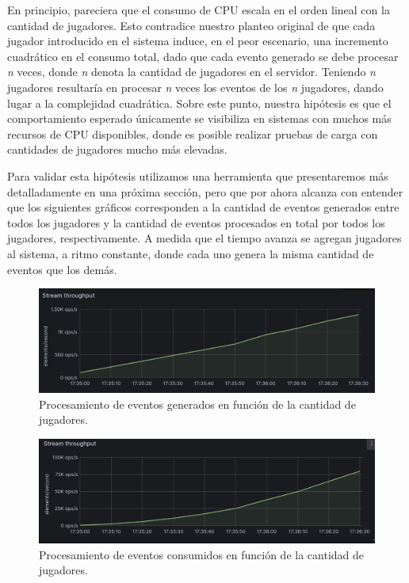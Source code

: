 En principio, pareciera que el consumo de CPU escala en el orden lineal con la cantidad de jugadores. Esto contradice nuestro planteo original
de que cada jugador introducido en el sistema induce, en el peor escenario, una incremento cuadrático en el consumo total, dado que cada evento generado se debe procesar \textit{n} veces, donde \textit{n} denota la cantidad de jugadores en el servidor.
Teniendo \textit{n} jugadores resultaría en procesar \textit{n} veces los eventos de los \textit{n} jugadores, dando lugar a la complejidad cuadrática.
Sobre este punto, nuestra hipótesis es que el comportamiento esperado únicamente se visibiliza en sistemas con muchos más recursos de CPU disponibles, donde es posible realizar pruebas de carga
con cantidades de jugadores mucho más elevadas.

Para validar esta hipótesis utilizamos una herramienta que presentaremos más detalladamente en una próxima sección, pero que por ahora alcanza con entender que los siguientes gráficos corresponden a la cantidad de eventos generados entre todos los jugadores
y la cantidad de eventos procesados en total por todos los jugadores, respectivamente. A medida que el tiempo avanza se agregan jugadores al sistema, a ritmo constante, donde cada uno genera la misma cantidad de eventos que los demás.

\begin{figure}[htbp]
    \centering
    \includegraphics[width=1\textwidth]{../assets/stream-producer-metrics.png}
    \caption{Procesamiento de eventos generados en función de la cantidad de jugadores.}
\end{figure}

\begin{figure}[htbp]
    \centering
    \includegraphics[width=1\textwidth]{../assets/stream-consumer-metrics.png}
    \caption{Procesamiento de eventos consumidos en función de la cantidad de jugadores.}
\end{figure}

